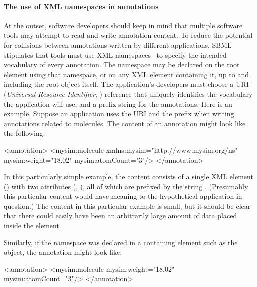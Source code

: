 \paragraph{The use of XML namespaces in annotations}


At the outset, software developers should keep in mind that
multiple software tools may attempt to read and write annotation
content.  To reduce the potential for collisions between
annotations written by different applications, SBML \thisLV
stipulates that tools must use XML namespaces~\citep{bray:1999} to
specify the intended vocabulary of every annotation.  The namespace may be declared on the root element using that namespace, or on any XML element containing it, up to and including the root  object itself.  The
application's developers must choose a URI (\emph{Universal
  Resource Identifier}; \citealt{harold:2001,w3c:2000}) reference
that uniquely identifies the vocabulary the application will use,
and a prefix string for the annotations.  Here is an example.
Suppose an application uses the URI 
and the prefix  when writing annotations related to 
molecules.  The content of an annotation might look like the
following:

\begin{example}
<annotation>
    <mysim:molecule xmlns:mysim="http://www.mysim.org/ns"
         mysim:weight="18.02" mysim:atomCount="3"/>
</annotation>
\end{example}

In this particularly simple example, the content consists of a single
XML element () with two attributes
(, ), all of which are prefixed by
the string .  (Presumably this particular content
would have meaning to the hypothetical application in question.)
The content in this particular example is small, but it should be
clear that there could easily have been an arbitrarily large
amount of data placed inside the  element.

Similarly, if the  namespace was declared in a containing element such as the  object, the annotation might look like:

\begin{example}
<annotation>
    <mysim:molecule mysim:weight="18.02" mysim:atomCount="3"/>
</annotation>
\end{example}


